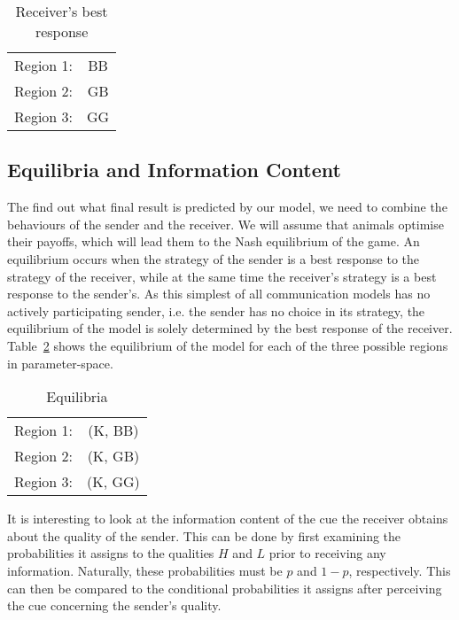 \documentclass[a4paper,12pt]{article}
\numberwithin{equation}{section}
\begin{document}
\vspace{-1mm}

\begin{table}[h]
\begin{center}
\begin{tabular}{cc}
Region 1: & BB\\
Region 2: & GB\\
Region 3: & GG
\end{tabular}
\end{center}
\caption{Receiver's best response}
\label{tab:BasicCueGame/BestResponseR}
\end{table}


\subsection{Equilibria and Information Content}
\label{sec:Basic Cue Game/Equilibria}

The find out what final result is predicted by our model, we need to combine the behaviours of the sender and the receiver. We will assume that animals optimise their payoffs, which will lead them to the Nash equilibrium of the game. An equilibrium occurs when the strategy of the sender is a best response to the strategy of the receiver, while at the same time the receiver's strategy is a best response to the sender's. As this simplest of all communication models has no actively participating sender, i.e. the sender has no choice in its strategy, the equilibrium of the model is solely determined by the best response of the receiver. Table~\ref{tab:BasicCueGame/Equilibria} shows the equilibrium of the model for each of the three possible regions in parameter-space.

\begin{table}[h]
\begin{center}
\begin{tabular}{cc}
Region 1: & (K, BB)\\
Region 2: & (K, GB)\\
Region 3: & (K, GG)
\end{tabular}
\end{center}
\caption{Equilibria}
\label{tab:BasicCueGame/Equilibria}
\end{table}

It is interesting to look at the information content of the cue the receiver obtains about the quality of the sender. This can be done by first examining the probabilities it assigns to the qualities $H$ and $L$ prior to receiving any information. Naturally, these probabilities must be $p$ and $1-p$, respectively. This can then be compared to the conditional probabilities it assigns after perceiving the cue concerning the sender's quality.
\end{document}
